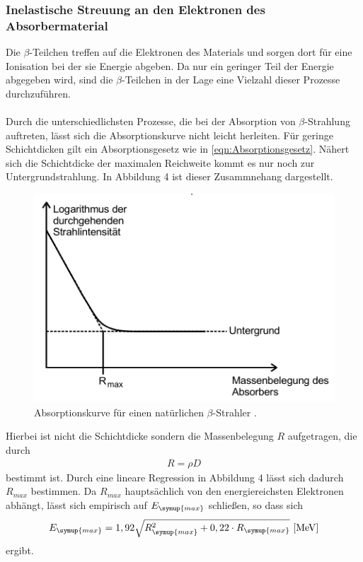 \subsubsection{Inelastische Streuung an den Elektronen des Absorbermaterial}
\label{sec:inelastischeStreuungAbsorber}
Die $\beta$-Teilchen treffen auf die Elektronen des Materials und sorgen dort für eine Ionisation bei
der sie Energie abgeben. Da nur ein geringer Teil der Energie abgegeben wird, sind die $\beta$-Teilchen
in der Lage eine Vielzahl dieser Prozesse durchzuführen.\\
\\
Durch die unterschiedlichsten Prozesse, die bei der Absorption von $\beta$-Strahlung auftreten, lässt sich
die Absorptionskurve nicht leicht herleiten. Für geringe Schichtdicken gilt ein Absorptionsgesetz wie in
\autoref{eqn:Absorptionsgesetz}. Nähert sich die Schichtdicke der maximalen Reichweite kommt es nur noch
zur Untergrundstrahlung. In Abbildung 4 ist dieser Zusammnehang dargestellt.
\begin{figure}
    \centering
    \label{fig:Absorptionskurveb}
    \includegraphics{Bilder/Absorptionskurve.png}
    \caption{Absorptionskurve für einen natürlichen $\beta$-Strahler \cite{sample}.}
\end{figure}
Hierbei ist nicht die Schichtdicke sondern die Massenbelegung $R$ aufgetragen, die durch
\begin{align}
    \label{eqn:Massenbelegung}
    R = \rho D
\end{align}
bestimmt ist. Durch eine lineare Regression in Abbildung 4 lässt sich
dadurch $R_{max}$ bestimmen. Da $R_{max}$ hauptsächlich von den energiereichsten Elektronen abhängt, lässt sich
empirisch auf $E_{\symup{max}}$ schließen, so dass sich
\begin{align}
    \label{eqn:emax}
    E_{\symup{max}} = 1,92 \sqrt{R_{\symup{max}}^2 + 0,22\cdot R_{\symup{max}}} \,\, [\unit{\mega\eV}]
\end{align}
ergibt.